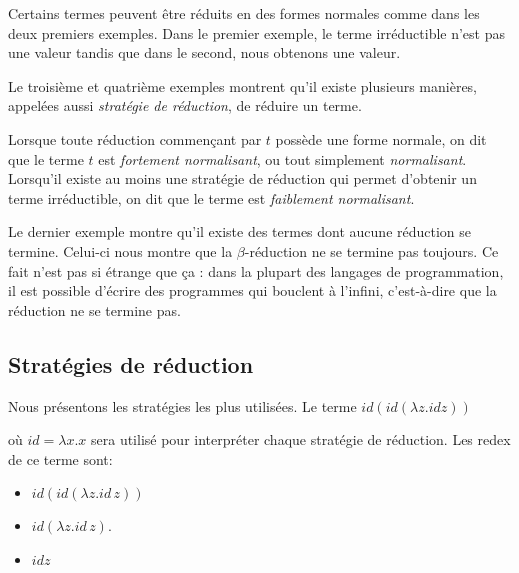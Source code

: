 Certains termes peuvent être réduits en des formes normales comme
dans les deux premiers exemples. Dans le premier exemple, le terme
irréductible n'est pas une valeur tandis que dans le second, nous obtenons
une valeur.

Le troisième et quatrième exemples montrent qu'il existe plusieurs manières,
appelées aussi \textit{stratégie de réduction}, de
réduire un terme.

Lorsque toute réduction commençant par $t$ possède une forme normale, on dit que
le terme $t$ est \textit{fortement normalisant}, ou tout simplement
\textit{normalisant}. Lorsqu'il existe au moins une stratégie de réduction qui
permet d'obtenir un terme irréductible, on dit que le terme est \textit{faiblement normalisant}.

Le dernier exemple montre qu'il existe des termes dont aucune réduction se
termine. Celui-ci nous montre que la $\beta$-réduction ne se termine pas toujours.
Ce fait n'est pas si étrange que ça : dans la plupart des langages de
programmation, il est possible d'écrire des programmes qui bouclent à l'infini,
c'est-à-dire que la réduction ne se termine pas.



\subsection{Stratégies de réduction}

Nous présentons les stratégies les plus utilisées. Le terme
\begin{math}
  id (id (\lambda z . id z))
\end{math}

où $id = \lambda x . x$ sera utilisé pour interpréter chaque stratégie de réduction.
Les redex de ce terme sont:
\begin{itemize}
\item $id (id (\lambda z . id \, z))$
\item $id (\lambda z . id \, z)$.
\item $id z$
\end{itemize}

